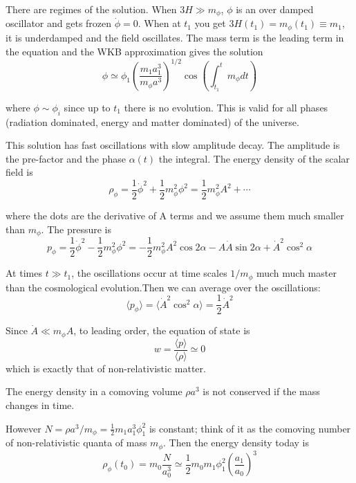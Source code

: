 \documentclass[12pt, twoside]{book}
\begin{document}
There are regimes of the solution. When $3H \gg m_\phi$, $\phi$ is an over damped oscillator and gets frozen $\dot \phi = 0$. When at $t_1$ you get $3H(t_1) = m_\phi(t_1) \equiv m_1$, it is underdamped and the field oscillates. The mass term is the leading term in the equation and the WKB approximation gives the solution
\[
\phi \simeq \phi_1 (\frac{m_1 a_1^3}{m_\phi a^3})^{1/2} \cos{(\int_{t_1}^t m_\phi dt)} 
\]

where $\phi \sim \phi_i$ since up to $t_1$ there is no evolution. This is valid for all phases (radiation dominated, energy and matter dominated) of the universe.

This solution has fast oscillations with slow amplitude decay. The amplitude is the pre-factor and the phase $\alpha(t)$ the integral. The energy density of the scalar field is 
\[
\rho_\phi =\frac{1}{2}\dot \phi^2 + \frac{1}{2}m_\phi^2 \phi^2 = \frac{1}{2}m_\phi^2 A^2 + \cdots \]

where the dots are the derivative of A terms and we assume them much smaller than $m_\phi$.  The pressure is 
\[ 
p_\phi = \frac{1}{2} \dot \phi^2 - \frac{1}{2} m_\phi^2 \phi^2 = -\frac{1}{2} m_\phi^2 A^2 \cos{2\alpha} - A \dot A \sin{2\alpha} + \dot A^2 \cos^2{\alpha} 
\]

At times $t \gg t_1$, the oscillations occur at time scales $1/m_\phi$ much much master than the cosmological evolution.Then we can average over the oscillations:
\[ 
\langle p_\phi \rangle = \langle \dot A^2 \cos^2{\alpha} \rangle = \frac{1}{2} \dot A^2 \]

Since $\dot A \ll m_\phi A$, to leading order, the equation of state is 
\[
w = \frac{ \langle p \rangle}{\langle \rho \rangle} \simeq 0 \]
which is exactly that of non-relativistic matter.

The energy density in a comoving volume $\rho a^3$ is not conserved if the mass changes in time.

However $N = \rho a^3/m_\phi = \frac{1}{2} m_1 a_1^3 \phi_1^2$ is constant; think of it as the comoving number of non-relativistic quanta of mass $m_{\phi}$. Then the  energy density today is
\[
\rho_{\phi}(t_0) = m_0 \frac{N}{a_0^3} \simeq \frac{1}{2}m_0 m_1 \phi_1^2 (\frac{a_1}{a_0})^3
\]
\end{document}
